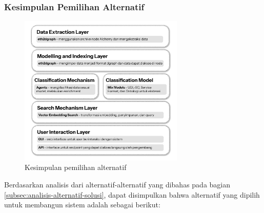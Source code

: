 \subsubsection{Kesimpulan Pemilihan Alternatif}

\begin{figure}[ht]
	\centering
	\includegraphics[width=0.7\textwidth]{resources/chapter-3/hasil-pemilihan.png}
    \caption{Kesimpulan pemilihan alternatif}
    \label{image:layer-architecture}
\end{figure}

Berdasarkan analisis dari alternatif-alternatif yang dibahas pada bagian \ref{subsec:analisis-alternatif-solusi}, dapat disimpulkan bahwa alternatif yang dipilih untuk membangun sistem adalah sebagai berikut:

